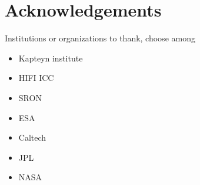 \clearpage
\chapter{Acknowledgements}

Institutions or organizations to thank, choose among

\begin{itemize}
    \item Kapteyn institute
    \item HIFI ICC
    \item SRON
    \item ESA
    \item Caltech
    \item JPL
    \item NASA
\end{itemize}


